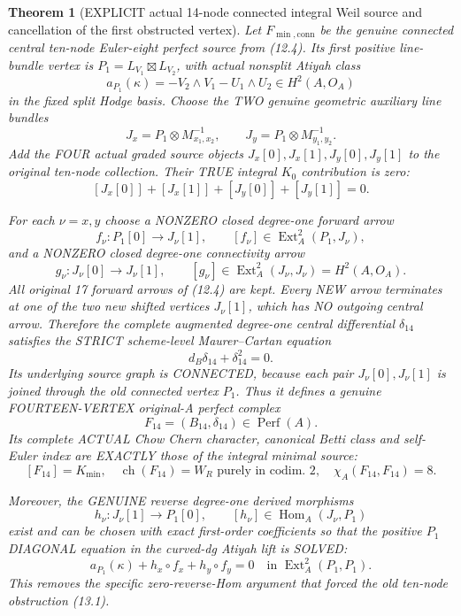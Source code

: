 \documentclass[11pt,a4paper]{article}
\newcommand{\ch}{\operatorname{ch}}
\newtheorem{theorem}{Theorem}[section]
\begin{document}
\begin{theorem}[EXPLICIT actual 14-node connected integral Weil source and cancellation of the first obstructed vertex]
Let
\(F_{\min,\mathrm{conn}}\)
be the genuine
connected central
ten-node
Euler-eight
perfect source
from (12.4).
Its first
positive line-bundle
vertex is
\(
 P_1=L_{V_1}\boxtimes
                   L_{V_2}
\),
with actual
nonsplit
Atiyah class
\[
 a_{P_1}(\kappa)
 =-V_2\wedge V_1
      -U_1\wedge U_2
          \in H^2(A,O_A)
\]
in the fixed
split Hodge basis.
Choose the TWO
genuine geometric
auxiliary line
bundles
\[
 \boxed{
 J_x=P_1\otimes
          M_{x_1,x_2}^{-1},
 \qquad
 J_y=P_1\otimes
          M_{y_1,y_2}^{-1}.
 }                                                       \tag{15.7}
\]
Add the FOUR
actual graded
source objects
\(
 J_x[0], J_x[1],
 J_y[0], J_y[1]
\)
to the original
ten-node
collection.
Their TRUE
integral \(K_0\)
contribution is
zero:
\[
 \boxed{
 [J_x[0]]+[J_x[1]]
   +[J_y[0]]+[J_y[1]]=0.
 }                                                       \tag{15.8}
\]

For each
\(\nu=x,y\)
choose a
NONZERO closed
degree-one
forward arrow
\[
 f_\nu:
   P_1[0]\longrightarrow J_\nu[1],
 \qquad
 [f_\nu]\in
        \operatorname{Ext}^2_A(P_1,J_\nu),
\]
and a NONZERO
closed degree-one
connectivity arrow
\[
 g_\nu:
    J_\nu[0]\longrightarrow J_\nu[1],
 \qquad
 [g_\nu]\in
        \operatorname{Ext}^2_A(J_\nu,J_\nu)
          =H^2(A,O_A).
\]
All original
17 forward arrows
of (12.4) are
kept. Every NEW
arrow terminates
at one of the
two new shifted
vertices
\(J_\nu[1]\),
which has
NO outgoing
central arrow.
Therefore the
complete augmented
degree-one
central differential
\(\delta_{14}\)
satisfies
the STRICT
scheme-level
Maurer--Cartan
equation
\[
 \boxed{
       d_B\delta_{14}+
                     \delta_{14}^2=0.
 }                                                       \tag{15.9}
\]
Its underlying
source graph
is CONNECTED,
because each
pair \(J_\nu[0],J_\nu[1]\)
is joined through
the old connected
vertex \(P_1\).
Thus it defines
a genuine
FOURTEEN-VERTEX
original-A
perfect complex
\[
 \boxed{
 F_{14}=(B_{14},\delta_{14})
                         \in\operatorname{Perf}(A).
 }                                                       \tag{15.10}
\]
Its complete
ACTUAL Chow
Chern character,
canonical Betti
class and
self-Euler index
are EXACTLY
those of
the integral
minimal source:
\[
 \boxed{
  [F_{14}]=K_{\min},\quad
  \ch(F_{14})=W_R
    \text{ purely in codim.\ 2},
  \quad
  \chi_A(F_{14},F_{14})=8.
 }                                                       \tag{15.11}
\]

Moreover, the
GENUINE reverse
degree-one
derived morphisms
\[
 h_\nu:
      J_\nu[1]\longrightarrow P_1[0],
 \qquad
 [h_\nu]\in
      \operatorname{Hom}_A(J_\nu,P_1)
\]
exist and can
be chosen
with exact
first-order
coefficients
so that the
positive \(P_1\)
DIAGONAL equation
in the
curved-dg
Atiyah lift is
SOLVED:
\[
 \boxed{
 a_{P_1}(\kappa)
      +h_x\circ f_x
      +h_y\circ f_y=0
 \quad\text{in }
      \operatorname{Ext}^2_A(P_1,P_1).
 }                                                       \tag{15.12}
\]
This removes
the specific
zero-reverse-Hom
argument that
forced the old
ten-node
obstruction
(13.1).
\end{theorem}
\end{document}
